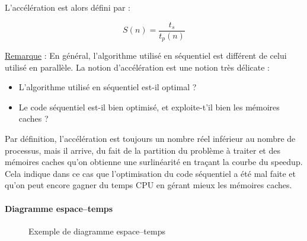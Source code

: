 \documentclass[fleqn,11pt]{article}
\begin{document}
L'accélération est alors défini par :

\begin{equation}
 S(n) = \frac{t_{s}}{t_{p}(n)}
\end{equation}

\underline{Remarque} : En général, l'algorithme utilisé en séquentiel est différent de celui utilisé
en parallèle. La notion d'accélération est une notion très délicate : 
\begin{itemize}
 \item L'algorithme utilisé en séquentiel est-il optimal ? 
 \item Le code séquentiel est-il bien optimisé, et exploite-t'il bien les mémoires caches ?
\end{itemize}

Par définition, l'accélération est toujours un nombre réel inférieur au nombre de processus, mais il arrive, du fait
de la partition du problème à traiter et des mémoires caches qu'on obtienne une surlinéarité en traçant
la courbe du speedup. Cela indique dans ce cas que l'optimisation du code séquentiel a été mal faite
et qu'on peut encore gagner du temps CPU en gérant mieux les mémoires caches.

\paragraph{Diagramme espace--temps}

\begin{figure}[htbp]
\centering
{}
\caption{Exemple de diagramme espace--temps}
\label{fig::spacetimediag}
\end{figure}
\end{document}
